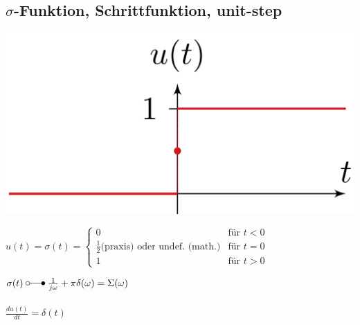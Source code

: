 	\subsection{$\sigma$-Funktion, Schrittfunktion, unit-step}
		\begin{minipage}{0.2\textwidth}
			\includegraphics[width=\textwidth]{./bilder/funktionen/sprungF.png}
		\end{minipage}
		\qquad
		\begin{minipage}{0.45\textwidth}
			$u(t) = \sigma(t) =	\begin{cases}
			0 & \text{f\"ur } t < 0 \\
			\frac{1}{2} \text{(praxis)}  \text{ oder undef. (math.)} & \text{f\"ur } t = 0 \\
			1 & \text{f\"ur } t > 0
			\end{cases}$
		\end{minipage}
		\qquad
		\begin{minipage}{0.25\textwidth}						
			$\sigma(t) \; \laplace \; \frac{1}{j\omega} + \pi\delta(\omega) = \Sigma(\omega)$ \\
			\\
			$\frac{du(t)}{dt}=\delta(t)$\\
		\end{minipage}
	
	

